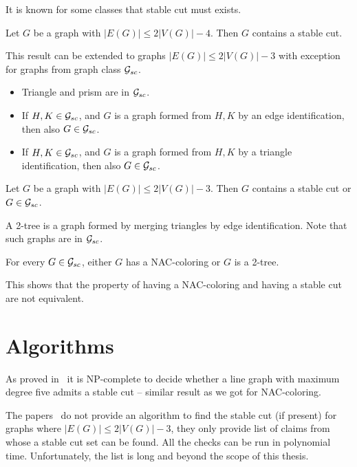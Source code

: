 It is known for some classes that stable cut must exists.
%
\begin{theorem}
	Let \( G \) be a graph with \( |E(G)| \le 2|V(G)|-4 \).
	Then \( G \) contains a stable cut.
\end{theorem}
%
This result can be extended to graphs \( |E(G)| \le 2|V(G)|-3 \) with exception
for graphs from graph class \( \mathcal{G}_{sc} \).
%
\begin{itemize}
	\item Triangle and prism are in \( \mathcal{G}_{sc} \).
	\item If \( H, K \in \mathcal{G}_{sc} \), and \( G \) is a graph
	      formed from \( H, K \) by an edge identification,
	      then also \( G \in \mathcal{G}_{sc} \).
	\item If \( H, K \in \mathcal{G}_{sc} \), and \( G \) is a graph
	      formed from \( H, K \) by a triangle identification,
	      then also \( G \in \mathcal{G}_{sc} \).
\end{itemize}
%
%
\begin{theorem}
	Let \( G \) be a graph with \( |E(G)| \le 2|V(G)|-3 \). Then \( G \) contains
	a stable cut or \( G \in \mathcal{G}_{sc} \).
\end{theorem}
%
A 2-tree is a graph formed by merging triangles by edge identification.
Note that such graphs are in \( \mathcal{G}_{sc} \).
%
\begin{lemma}
	For every \( G \in \mathcal{G}_{sc} \), either \( G \) has a NAC-coloring
	or \( G \) is a 2-tree.
\end{lemma}
%
This shows that the property of having a NAC-coloring and having a stable cut
are not equivalent.

\section{Algorithms}

As proved in~\cite{stable_cuts_complexity} it is NP-complete
to decide whether a line graph with maximum degree five admits a stable cut
-- similar result as we got for NAC-coloring.

The papers~\cite{stable_cuts_2v_3,stable_cuts_2v_3_revisit} do not provide
an algorithm to find the stable cut (if present)
for graphs where \(|E(G)| \le 2|V(G)|-3 \),
they only provide list of claims
from whose a stable cut set can be found.
All the checks can be run in polynomial time.
Unfortunately, the list is long and beyond the scope of this thesis.

